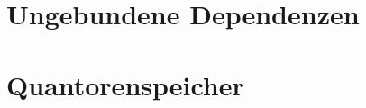 \documentclass[handout,aspectratio=1610,dvipsnames]{beamer}
\begin{document}
  \section{Ungebundene Dependenzen}
  \let\woopsi\section\let\section\subsection\let\subsection\subsubsection
  
  \let\subsection\section\let\section\woopsi

  \section{Quantorenspeicher}
  \let\woopsi\section\let\section\subsection\let\subsection\subsubsection
  
  \let\subsection\section\let\section\woopsi
\end{document}
